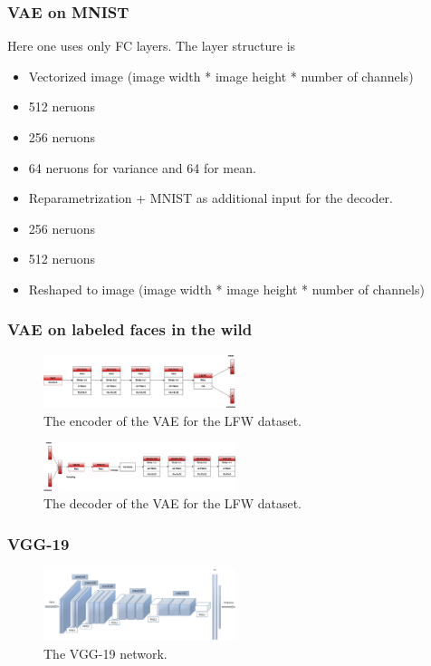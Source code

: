 \documentclass[
     11pt,         %
     a4paper,      %
     oneside,
     ]{article}
\begin{document}
\subsubsection{VAE on MNIST}
Here one uses only FC layers.
The layer structure is
\begin{itemize}
  \item Vectorized image (image width * image height * number of channels)
  \item 512 neruons
  \item 256 neruons
  \item 64 neruons for variance and 64 for mean.
  \item Reparametrization + MNIST as additional input for the decoder.
  \item 256 neruons
  \item 512 neruons
  \item Reshaped to image (image width * image height * number of channels)
\end{itemize}

\subsubsection{VAE on labeled faces in the wild}
\begin{figure}[H]
  \begin{center}
    \includegraphics[width=0.5\textwidth]{images/cifar10_encoder.png}
    \caption{The encoder of the VAE for the LFW dataset.\cite{decEncCIFAR10}}
  \end{center}
\end{figure}
\begin{figure}[H]
  \begin{center}
    \includegraphics[width=0.5\textwidth]{images/cifar10_decoder.png}
    \caption{The decoder of the VAE for the LFW dataset.\cite{decEncCIFAR10}}
  \end{center}
\end{figure}

\subsubsection{VGG-19}
\begin{figure}[H]
  \begin{center}
    \includegraphics[width=0.5\textwidth]{images/VGG19-orig.png}
    \caption{The VGG-19 network.\cite{VGG19}}
  \end{center}
\end{figure}
\end{document}
